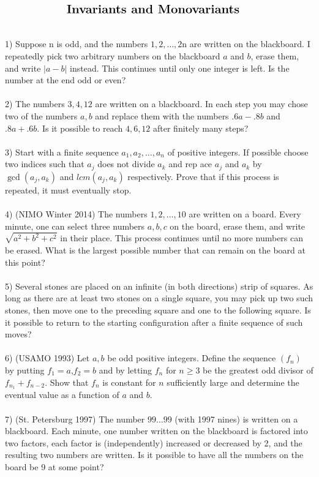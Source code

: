 \documentclass{article}
\newcommand{\lcm}{lcm }
\begin{document}
$\centerline{\Large \textbf{Invariants and Monovariants}}$
\\
\\
\\
1) Suppose n is odd, and the numbers $1, 2,\ldots, 2$n are written on the blackboard. I repeatedly pick two arbitrary numbers on the blackboard $a$ and $b$, erase them, and write $\left|a - b\right|$ instead. This continues until only one integer is left. Is the number at the end odd or even?
\\
\\
2) The numbers $3,4,12$ are written on a blackboard. In each step you may chose two of the numbers $a,b$ and replace them with the numbers $.6a-.8b$ and $.8a+.6b$. Is it possible to reach $4,6,12$ after finitely many steps?
\\
\\
3) Start with a finite sequence $a_1,a_2,\ldots,a_n$ of positive integers. If possible choose two indices such that $a_j$ does not divide $a_k$ and rep ace $a_j$ and $a_k$ by $\gcd(a_j,a_k)$ and $\lcm(a_j,a_k)$ respectively. Prove that if this process is repeated, it must eventually stop.
\\
\\
4) (NIMO Winter 2014) The numbers $1,2,\ldots,10$ are written on a board. Every minute, one can select three numbers $a,b,c$ on the board, erase them, and write $\sqrt{a^2+b^2+c^2}$ in their place. This process continues until no more numbers can be erased. What is the largest possible number that can remain on the board at this point?
\\
\\
5) Several stones are placed on an infinite (in both directions) strip of squares. As long as there are at least two stones on a single square, you may pick up two such stones, then
move one to the preceding square and one to the following square. Is it possible to return to the starting configuration after a finite sequence of such moves?
\\
\\
6) (USAMO 1993) Let $a,b$ be odd positive integers. Define the sequence $(f_n)$ by putting $f_1=a$,$f_2=b$ and by letting $f_n$ for $n\ge 3$ be the greatest odd divisor of $f_{n_1}+f_{n-2}$. Show that $f_n$ is constant for $n$ sufficiently large and determine the eventual value as a function of $a$ and $b$.
\\
\\
7) (St. Petersburg 1997) The number $99\ldots99$ (with 1997 nines) is written on a blackboard. Each minute, one number written on the blackboard is factored into two factors, each factor is (independently) increased or decreased by 2, and the resulting two numbers are written. Is it possible to have all the numbers on the board be 9 at some point?
\end{document}
